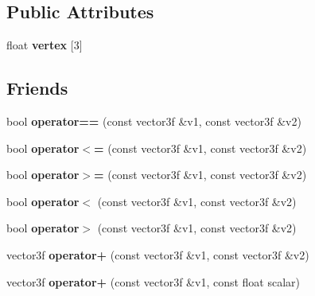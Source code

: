 \subsection*{Public Attributes}
\begin{CompactItemize}
\item 
{}
float {\bf vertex} [3]\label{classvector3f_m0}

\end{CompactItemize}
\subsection*{Friends}
\begin{CompactItemize}
\item 
{}
bool {\bf operator==} (const vector3f \&v1, const vector3f \&v2)\label{classvector3f_l0}

\item 
{}
bool {\bf operator$<$=} (const vector3f \&v1, const vector3f \&v2)\label{classvector3f_l1}

\item 
{}
bool {\bf operator$>$=} (const vector3f \&v1, const vector3f \&v2)\label{classvector3f_l2}

\item 
{}
bool {\bf operator$<$} (const vector3f \&v1, const vector3f \&v2)\label{classvector3f_l3}

\item 
{}
bool {\bf operator$>$} (const vector3f \&v1, const vector3f \&v2)\label{classvector3f_l4}

\item 
{}
vector3f {\bf operator+} (const vector3f \&v1, const vector3f \&v2)\label{classvector3f_l5}

\item 
{}
vector3f {\bf operator+} (const vector3f \&v1, const float scalar)\label{classvector3f_l6}


\end{CompactItemize}
